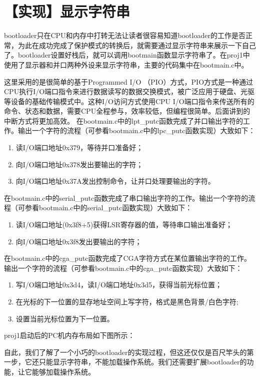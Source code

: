 \section{【实现】显示字符串}\label{ux5b9eux73b0ux663eux793aux5b57ux7b26ux4e32}

bootloader只在CPU和内存中打转无法让读者很容易知道bootloader的工作是否正常，为此在成功完成了保护模式的转换后，就需要通过显示字符串来展示一下自己了。bootloader设置好栈后，就可以调用bootmain函数显示字符串了。在proj1中使用了显示器和并口两种外设来显示字符串，主要的代码集中在bootmain.c中。

这里采用的是很简单的基于Programmed I/O
（PIO）方式，PIO方式是一种通过CPU执行I/O端口指令来进行数据读写的数据交换模式，被广泛应用于硬盘、光驱等设备的基础传输模式中。这种I/O访问方式使用CPU
I/O端口指令来传送所有的命令、状态和数据，需要CPU全程参与，效率较低，但编程很简单。后面讲到的中断方式将更加高效。
在bootmain.c中的lpt\_putc函数完成了并口输出字符的工作。输出一个字符的流程（可参看bootmain.c中的lpc\_putc函数实现）大致如下：

\begin{enumerate}
\def\labelenumi{\arabic{enumi}.}
\item
  读I/O端口地址0x379，等待并口准备好；
\item
  向I/O端口地址0x378发出要输出的字符；
\item
  向I/O端口地址0x37A发出控制命令，让并口处理要输出的字符。
\end{enumerate}

在bootmain.c中的serial\_putc函数完成了串口输出字符的工作。输出一个字符的流程（可参看bootmain.c中的serial\_putc函数实现）大致如下：

\begin{enumerate}
\def\labelenumi{\arabic{enumi}.}
\item
  读I/O端口地址(0x3f8+5)获得LSR寄存器的值，等待串口输出准备好；
\item
  向I/O端口地址0x3f8发出要输出的字符；
\end{enumerate}

在bootmain.c中的cga\_putc函数完成了CGA字符方式在某位置输出字符的工作。输出一个字符的流程（可参看bootmain.c中的cga\_putc函数实现）大致如下：

\begin{enumerate}
\def\labelenumi{\arabic{enumi}.}
\item
  写I/O端口地址0x3d4，读I/O端口地址0x3d5，获得当前光标位置；
\item
  在光标的下一位置的显存地址空间上写字符，格式是黑色背景/白色字符;
\item
  设置当前光标位置为下一位置。
\end{enumerate}

proj1启动后的PC机内存布局如下图所示：


自此，我们了解了一个小巧的bootloader的实现过程，但这还仅仅是百尺竿头的第一步，它还只能显示字符串，不能加载操作系统。我们还需要扩展bootloader的功能，让它能够加载操作系统。
